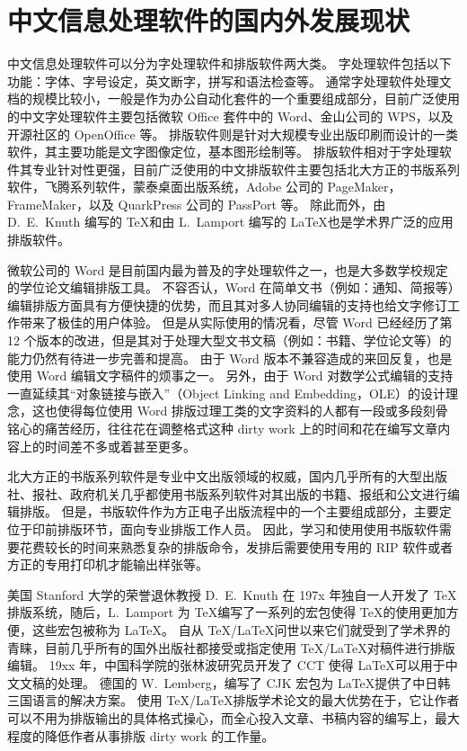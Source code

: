 \section{中文信息处理软件的国内外发展现状}
中文信息处理软件可以分为字处理软件和排版软件两大类。
字处理软件包括以下功能：字体、字号设定，英文断字，拼写和语法检查等。
通常字处理软件处理文档的规模比较小，一般是作为办公自动化套件的一个重要组成部分，目前广泛使用的中文字处理软件主要包括微软 Office 套件中的 Word、金山公司的 WPS，以及开源社区的 OpenOffice 等。
排版软件则是针对大规模专业出版印刷而设计的一类软件，其主要功能是文字图像定位，基本图形绘制等。
排版软件相对于字处理软件其专业针对性更强，目前广泛使用的中文排版软件主要包括北大方正的书版系列软件，飞腾系列软件，蒙泰桌面出版系统，Adobe 公司的 PageMaker，FrameMaker，以及 QuarkPress 公司的 PassPort 等。
除此而外，由 D.~E.~Knuth 编写的 \TeX 和由 L.~Lamport 编写的 \LaTeX 也是学术界广泛的应用排版软件。

微软公司的 Word 是目前国内最为普及的字处理软件之一，也是大多数学校规定的学位论文编辑排版工具。
不容否认，Word 在简单文书（例如：通知、简报等）编辑排版方面具有方便快捷的优势，而且其对多人协同编辑的支持也给文字修订工作带来了极佳的用户体验。
但是从实际使用的情况看，尽管 Word 已经经历了第 12 个版本的改进，但是其对于处理大型文书文稿（例如：书籍、学位论文等）的能力仍然有待进一步完善和提高。
由于 Word 版本不兼容造成的来回反复，也是使用 Word 编辑文字稿件的烦事之一。
另外，由于 Word 对数学公式编辑的支持一直延续其“对象链接与嵌入”（Object Linking and Embedding，OLE）的设计理念，这也使得每位使用 Word 排版过理工类的文字资料的人都有一段或多段刻骨铭心的痛苦经历，往往花在调整格式这种 dirty work 上的时间和花在编写文章内容上的时间差不多或着甚至更多。

北大方正的书版系列软件是专业中文出版领域的权威，国内几乎所有的大型出版社、报社、政府机关几乎都使用书版系列软件对其出版的书籍、报纸和公文进行编辑排版。
但是，书版软件作为方正电子出版流程中的一个主要组成部分，主要定位于印前排版环节，面向专业排版工作人员。
因此，学习和使用使用书版软件需要花费较长的时间来熟悉复杂的排版命令，发排后需要使用专用的 RIP 软件或者方正的专用打印机才能输出样张等。

美国 Stanford 大学的荣誉退休教授 D.~E.~Knuth 在 197x 年独自一人开发了 \TeX 排版系统，随后，L.~Lamport 为 \TeX 编写了一系列的宏包使得 \TeX 的使用更加方便，这些宏包被称为 \LaTeX。
自从 \TeX/\LaTeX 问世以来它们就受到了学术界的青睐，目前几乎所有的国外出版社都接受或指定使用 \TeX/\LaTeX 对稿件进行排版编辑。
19xx 年，中国科学院的张林波研究员开发了 CCT 使得 \LaTeX 可以用于中文文稿的处理。
德国的 W.~Lemberg，编写了 CJK 宏包为 \LaTeX 提供了中日韩三国语言的解决方案。
使用 \TeX/\LaTeX 排版学术论文的最大优势在于，它让作者可以不用为排版输出的具体格式操心，而全心投入文章、书稿内容的编写上，最大程度的降低作者从事排版 dirty work 的工作量。

